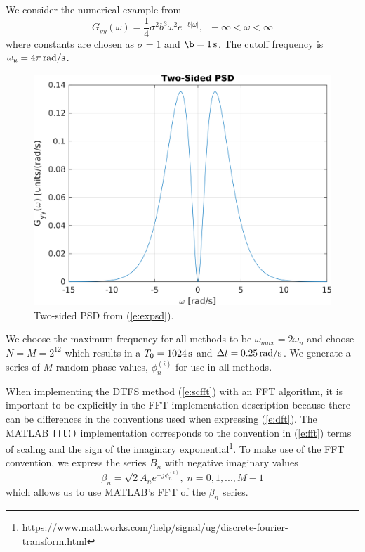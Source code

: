 \documentclass[11pt]{article}
\begin{document}
We consider the numerical example from \cite{shinozuka91simulation}
\begin{equation}
  G_{yy}(\omega) = \frac{1}{4} \sigma^2 b^3 \omega^2 e^{-b|\omega|}, \; \; -\infty < \omega < \infty
  \label{e:expsd}
\end{equation}
where constants are chosen as $\sigma=1$ and $\b=\unit[1]{s}$. The cutoff frequency is  $\omega_u = \unit[4 \pi]{rad/s} $.
\begin{figure}[hbt!]
  \centering
  \includegraphics[width=\FigWidth\textwidth]{images/two_sided.png}
  \caption{Two-sided PSD from (\ref{e:expsd}).}
  \label{f:psd}
\end{figure}
We choose the maximum frequency for all methods to be $\omega_{max}=2\omega_u$ and choose $N=M=2^{12}$ which results in a $T_0 = \unit[1024]{s}$ and $\Delta t = \unit[0.25]{rad/s}$.  We generate a series of $M$ random phase values, $\phi^{(i)}_n$ for use in all methods.

When implementing the DTFS method (\ref{e:scfft}) with an FFT algorithm, it is important to be explicitly in the FFT implementation description because there can be differences in the conventions used when expressing (\ref{e:dft}).  The MATLAB \texttt{fft()} implementation corresponds to the convention in (\ref{e:fft}) terms of scaling and the sign of the imaginary exponential\footnote{\url{https://www.mathworks.com/help/signal/ug/discrete-fourier-transform.html}}.  To make use of the FFT convention, we express the series $B_n$ with negative imaginary values
\begin{equation}
  \beta_n = \sqrt{2} A_n e^{-j\phi^{(i)}_n}, \; n=0,1,...,M-1
\end{equation}
which allows us to use MATLAB's FFT of the $\beta_n$ series.
\end{document}
